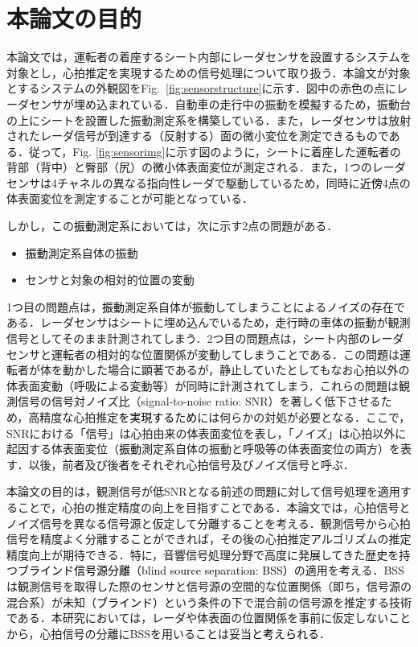 \section{本論文の目的}
本論文では，運転者の着座するシート内部にレーダセンサを設置するシステムを対象とし，心拍推定を実現するための信号処理について取り扱う．本論文が対象とするシステムの外観図をFig.~\ref{fig:sensorstructure}に示す．図中の赤色の点にレーダセンサが埋め込まれている．自動車の走行中の振動を模擬するため，振動台の上にシートを設置した振動測定系を構築している．また，レーダセンサは放射されたレーダ信号が到達する（反射する）面の微小変位を測定できるものである．従って，Fig. \ref{fig:sensorimg}に示す図のように，シートに着座した運転者の背部（背中）と臀部（尻）の\textcolor{black}{微小}体表面変位が測定される．また，1つのレーダセンサは4チャネルの異なる指向性レーダで駆動しているため，同時に\textcolor{black}{近傍}4点の体表面変位を測定することが可能となっている．

しかし，この\textcolor{black}{振動}測定系においては，次に示す2点の問題がある．
\begin{itemize}
	\item \textcolor{black}{振動}測定系自体の振動
	\item センサと対象の相対的位置の変動
\end{itemize}
1つ目の問題点は，\textcolor{black}{振動}測定系自体が振動してしまうことによるノイズの存在である．レーダセンサはシートに埋め込んでいるため，走行時の車体の振動が観測信号としてそのまま計測されてしまう．2つ目の問題点は，シート内部のレーダセンサと運転者の相対的な位置関係が変動してしまうことである．この問題は運転者が体を動かした場合に顕著であるが，静止していたとしてもなお心拍以外の体表面変動（呼吸による変動等）が同時に計測されてしまう．これらの問題は観測信号の信号対ノイズ比（signal-to-noise ratio: SNR）を著しく低下させるため，高精度な心拍推定\textcolor{black}{を実現するため}には何らかの対処が必要となる．ここで，SNRにおける「信号」は心拍由来の体表面変位を表し，「ノイズ」は心拍以外に起因する体表面変位（\textcolor{black}{振動}測定系自体の振動と呼吸等の体表面変位の両方）を表す．以後，前者及び後者をそれぞれ心拍信号及びノイズ信号と呼ぶ．

本論文の目的は，観測信号が低SNRとなる前述の問題に対して信号処理を適用することで，心拍の推定精度の向上を目指すことである．本論文では，心拍信号とノイズ信号を異なる信号源と仮定して分離することを考える．観測信号から心拍信号を精度よく分離することができれば，その後の心拍推定アルゴリズムの推定精度向上が期待できる．特に，音響信号処理分野で高度に発展してきた歴史を持つ\textcolor{black}{ブラインド信号源分離（blind source separation: BSS）}\cite{originica, ica2}の適用を考える．BSSは観測信号を取得した際のセンサと信号源の空間的な位置関係（即ち，信号源の混合系）が未知\textcolor{black}{（ブラインド）}という条件の下で混合前の信号源を推定する技術である．本研究においては，レーダや体表面の位置関係を事前に仮定しないことから，心拍信号の分離にBSSを用いることは妥当\textcolor{black}{と考えられる}．

